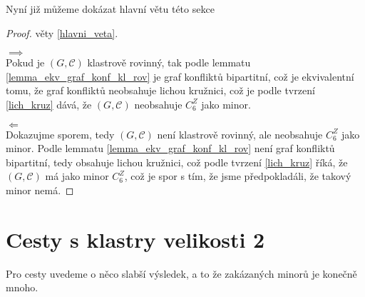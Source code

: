 Nyní již můžeme dokázat hlavní větu této sekce
\begin{proof} věty \ref{hlavni_veta}. 

$\implies$ \\
Pokud je $(G,\mathcal C)$ klastrově rovinný, tak podle lemmatu \ref{lemma_ekv_graf_konf_kl_rov} je graf konfliktů bipartitní, což je ekvivalentní tomu, že graf konfliktů neobsahuje lichou kružnici, což je podle tvrzení \ref{lich_kruz} dává, že $(G,\mathcal C)$ neobsahuje $C_6^Z$ jako minor.

$\Longleftarrow$ \\
Dokazujme sporem, tedy $(G,\mathcal C)$ není klastrově rovinný, ale neobsahuje $C_6^Z$ jako minor. Podle lemmatu \ref{lemma_ekv_graf_konf_kl_rov} není graf konfliktů bipartitní, tedy obsahuje lichou kružnici, což podle tvrzení \ref{lich_kruz} říká, že $(G,\mathcal C)$ má jako minor $C_6^Z$, což je spor s tím, že jsme předpokladáli, že takový minor nemá.
\end{proof}

\section{Cesty s klastry velikosti 2}
Pro cesty uvedeme o něco slabší výsledek, a to že zakázaných minorů je konečně mnoho.


